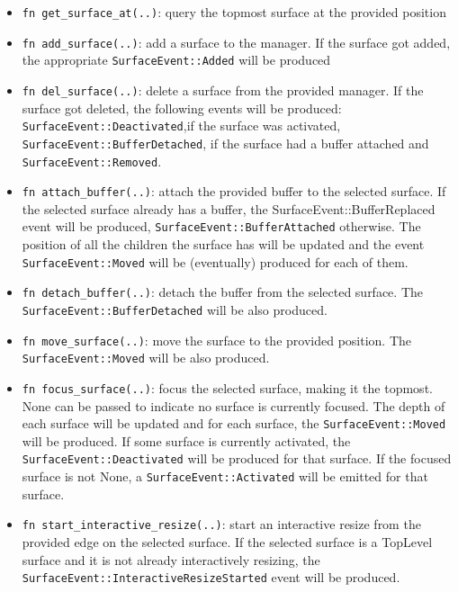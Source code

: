 \begin{itemize}
	\item \lstinline|fn get_surface_at(..)|: query the topmost surface at the provided position
	
	\item \lstinline|fn add_surface(..)|: add a surface to the manager. If the surface got added, the appropriate \lstinline|SurfaceEvent::Added| will be produced
	
	\item \lstinline|fn del_surface(..)|: delete a surface from the provided manager. If the surface got deleted, the following events will be produced: \lstinline|SurfaceEvent::Deactivated|,if the surface was activated, \lstinline|SurfaceEvent::BufferDetached|, if the surface had a buffer attached and \lstinline|SurfaceEvent::Removed|.
	
	\item \lstinline|fn attach_buffer(..)|: attach the provided buffer to the selected surface. If the selected surface already has a buffer, the SurfaceEvent::BufferReplaced event will be produced, \lstinline|SurfaceEvent::BufferAttached| otherwise. The position of all the children the surface has will be updated and the event \lstinline|SurfaceEvent::Moved| will be (eventually) produced for each of them.
	
	\item \lstinline|fn detach_buffer(..)|: detach the buffer from the selected surface. The \lstinline|SurfaceEvent::BufferDetached| will be also produced.
	
	\item \lstinline|fn move_surface(..)|: move the surface to the provided position. The \lstinline|SurfaceEvent::Moved| will be also produced.
	
	\item \lstinline|fn focus_surface(..)|: focus the selected surface, making it the topmost. None can be passed to indicate no surface is currently focused. The depth of each surface will be updated and for each surface, the \lstinline|SurfaceEvent::Moved| will be produced. If some surface is currently activated, the \lstinline|SurfaceEvent::Deactivated| will be produced for that surface. If the focused surface is not None, a \lstinline|SurfaceEvent::Activated| will be emitted for that surface.
	
	\item \lstinline|fn start_interactive_resize(..)|: start an interactive resize from the provided edge on the selected surface. If the selected surface is a TopLevel surface and it is not already interactively resizing, the \lstinline|SurfaceEvent::InteractiveResizeStarted| event will be produced.
	

\end{itemize}
